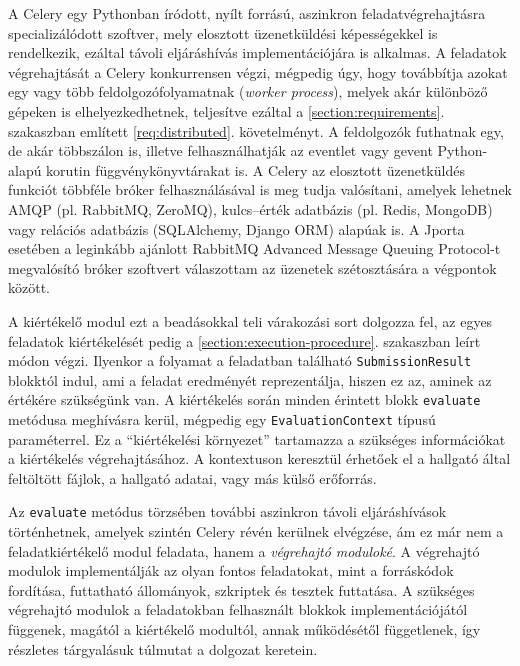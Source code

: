 A Celery egy Pythonban íródott, nyílt forrású, aszinkron feladatvégrehajtásra specializálódott szoftver, mely elosztott üzenetküldési képességekkel is rendelkezik, ezáltal távoli eljáráshívás implementációjára is alkalmas.
A feladatok végrehajtását a Celery konkurrensen végzi, mégpedig úgy, hogy továbbítja azokat egy vagy több feldolgozófolyamatnak (\textit{worker process}), melyek akár különböző gépeken is elhelyezkedhetnek, teljesítve ezáltal a \ref{section:requirements}. szakaszban említett \ref{req:distributed}. követelményt.
A feldolgozók futhatnak egy, de akár többszálon is, illetve felhasználhatják az eventlet vagy gevent Python-alapú korutin függvénykönyvtárakat is.
A Celery az elosztott üzenetküldés funkciót többféle bróker felhasználásával is meg tudja valósítani, amelyek lehetnek AMQP (pl. RabbitMQ, ZeroMQ), kulcs--érték adatbázis (pl. Redis, MongoDB) vagy relációs adatbázis (SQLAlchemy, Django ORM) alapúak is.
A Jporta esetében a leginkább ajánlott RabbitMQ Advanced Message Queuing Protocol-t megvalósító bróker szoftvert válaszottam az üzenetek szétosztására a végpontok között. \cite{wiki:Celery} \cite{Celery}


A kiértékelő modul ezt a beadásokkal teli várakozási sort dolgozza fel, az egyes feladatok kiértékelését pedig a \ref{section:execution-procedure}. szakaszban leírt módon végzi.
Ilyenkor a folyamat a feladatban található \texttt{SubmissionResult} blokktól indul, ami a feladat eredményét reprezentálja, hiszen ez az, aminek az értékére szükségünk van.
A kiértékelés során minden érintett blokk \texttt{evaluate} metódusa meghívásra kerül, mégpedig egy \texttt{EvaluationContext} típusú paraméterrel.
Ez a ``kiértékelési környezet'' tartamazza a szükséges információkat a kiértékelés végrehajtásához.
A kontextuson keresztül érhetőek el a hallgató által feltöltött fájlok, a hallgató adatai, vagy más külső erőforrás.

Az \texttt{evaluate} metódus törzsében további aszinkron távoli eljáráshívások történhetnek, amelyek szintén Celery révén kerülnek elvégzése, ám ez már nem a feladatkiértékelő modul feladata, hanem a \textit{végrehajtó moduloké}.
A végrehajtó modulok implementálják az olyan fontos feladatokat, mint a forráskódok fordítása, futtatható állományok, szkriptek és tesztek futtatása.
A szükséges végrehajtó modulok a feladatokban felhasznált blokkok implementációjától függenek, magától a kiértékelő modultól, annak működésétől függetlenek, így részletes tárgyalásuk túlmutat a dolgozat keretein.

